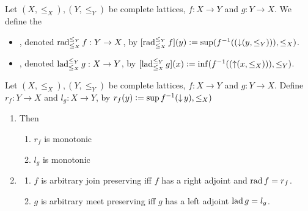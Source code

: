 \documentclass{book}
\begin{document}
	\begin{defn} 
		Let $(X, \leq_X), (Y, \leq_Y)$ be complete lattices, $f:X \rightarrow Y$ and $g:Y \rightarrow X$. We define the 
		\begin{itemize}
			\item {}, denoted $\operatorname{\text{rad}}_{\leq_X}^{\leq_Y}f : Y \rightarrow X$, by $[\operatorname{\text{rad}}_{\leq_X}^{\leq_Y}f](y) \vcentcolon= \sup (f^{-1}((\operatorname{\downarrow} (y, \leq_Y))), \leq_X)$.
			\item {}, denoted $\operatorname{\text{lad}}_{\leq_X}^{\leq_Y}g  : X \rightarrow Y$, by $[\operatorname{\text{lad}}_{\leq_X}^{\leq_Y}g](x) \vcentcolon= \inf (f^{-1}((\operatorname{\uparrow} (x, \leq_X))), \leq_Y)$.
		\end{itemize}
	\end{defn}
	
	\begin{ex}
		Let $(X, \leq_X), (Y, \leq_Y)$ be complete lattices, $f:X \rightarrow Y$ and $g:Y \rightarrow X$. Define $r_f : Y \rightarrow X$ and $l_g:X \rightarrow Y$, by $r_f(y) \vcentcolon= \sup f^{-1}(\operatorname{\downarrow} y), \leq_X)$ 
		\begin{enumerate}
			\item Then 
			\begin{enumerate}
				\item $r_f$ is monotonic
				\item $l_g$ is monotonic
			\end{enumerate}
			\item 
			\begin{enumerate}
				\item $f$ is arbitrary join preserving iff $f$ has a right adjoint and $\operatorname{\text{rad}} f = r_f$.
				\item $g$ is arbitrary meet preserving iff $g$ has a left adjoint $\operatorname{\text{lad}} g = l_g$.
			\end{enumerate}
		\end{enumerate}
	\end{ex}
	
\end{document}
